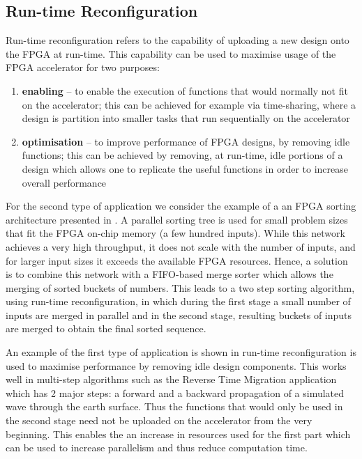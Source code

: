 \subsection{Run-time Reconfiguration}
\label{sec:run-time-reconfiguration}
Run-time reconfiguration refers to the capability of uploading a new
design onto the FPGA at run-time. This capability can be used to
maximise usage of the FPGA accelerator for two purposes:
\begin{enumerate}
\item \textbf{enabling} -- to enable the execution of functions that
  would normally not fit on the accelerator; this can be achieved for
  example via time-sharing, where a design is partition into smaller
  tasks that run sequentially on the accelerator\cite{trimberger1998scheduling}
\item \textbf{optimisation} -- to improve performance of FPGA designs,
  by removing idle functions; this can be achieved by removing, at
  run-time, idle portions of a design which allows one to replicate
  the useful functions in order to increase overall performance
\end{enumerate}


For the second type of application we consider the example of a an
FPGA sorting architecture presented in \cite{koch2011fpgasort}. A
parallel sorting tree is used for small problem sizes that fit the
FPGA on-chip memory (a few hundred inputs). While this network
achieves a very high throughput, it does not scale with the number of
inputs, and for larger input sizes it exceeds the available FPGA
resources. Hence, a solution is to combine this network with a
FIFO-based merge sorter\cite{marcelino2009unbalanced} which allows the
merging of sorted buckets of numbers. This leads to a two step sorting
algorithm, using run-time reconfiguration, in which during the first
stage a small number of inputs are merged in parallel and in the
second stage, resulting buckets of inputs are merged to obtain the
final sorted sequence.

An example of the first type of application is shown in
\cite{Xinyu:Qiwei:Luk:Qiang:Pell:2012} run-time reconfiguration is
used to maximise performance by removing idle design components. This
works well in multi-step algorithms such as the Reverse Time Migration
application which has 2 major steps: a forward and a backward
propagation of a simulated wave through the earth surface. Thus the
functions that would only be used in the second stage need not be
uploaded on the accelerator from the very beginning. This enables the
an increase in resources used for the first part which can be used to
increase parallelism and thus reduce computation time.

